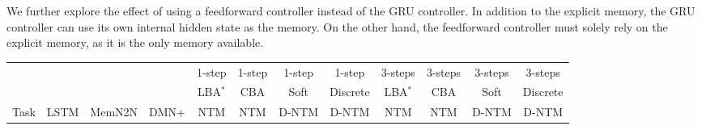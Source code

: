 \documentclass[12pt]{article}
\begin{document}
We further explore the effect of using a feedforward controller instead of the GRU controller. In addition to the explicit memory, the GRU controller can use its own internal hidden state as the memory. On the other hand, the feedforward controller must solely rely on the explicit memory, as it is the only memory available.


\begin{table*}[htbp]
\vspace{-2mm}
  \centering
  \tiny 
\begin{tabular}{ | l || c | c | c || c |c |c|c|| c | c | c|c| }
\hline
& & & & 1-step & 1-step & 1-step & 1-step & 3-steps & 3-steps & 3-steps & 3-steps \\ 
& & & & LBA$^{\ast}$ & CBA & Soft & Discrete & LBA$^{\ast}$ & CBA & Soft & Discrete\\
Task & LSTM & MemN2N & DMN+ & NTM & NTM & D-NTM & D-NTM  & NTM & NTM & D-NTM & D-NTM \\ \hline


\end{tabular}
\end{table*}
\end{document}
